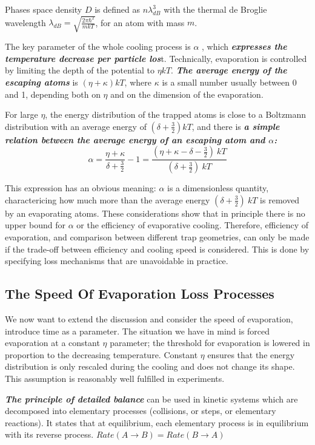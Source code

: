 \documentclass[12]{article}
\begin{document}
Phases space density $D$ is defined as $n\lambda^3_{dB}$ with the thermal de Broglie wavelength $\lambda_{dB} = \sqrt{\frac{2\pi \hbar^2}{mkT}}$, for an atom with mass $m$. 

The key parameter of the whole cooling process is $\alpha$ , which \textbf{\textit{expresses the temperature decrease per particle los}}t. Technically, evaporation is controlled by limiting the depth of the potential to $\eta kT$. \textbf{\textit{The average energy of the escaping atoms}} is $(\eta + \kappa)kT$, where $\kappa$ is a small number usually between 0 and 1, depending both on $\eta$ and on the dimension of the evaporation.  

For large $\eta$, the energy distribution of the trapped atoms is close to a Boltzmann distribution with an average energy of $(\delta+\frac{3}{2})kT$, and there is \textbf{\textit{a simple relation between the average energy of an escaping atom and $\alpha$:}} $$\alpha= \frac{\eta+\kappa}{\delta+\frac{3}{2}}-1 =\frac{(\eta+\kappa-\delta-\frac{3}{2})\ kT}{(\delta+\frac{3}{2})\ kT}$$

This expression has an obvious meaning: $\alpha$ is a dimensionless quantity, charactericing how much more than the average energy $(\delta+\frac{3}{2})\ kT$ is removed by an evaporating atoms. These considerations show that in principle there is no upper bound for $\alpha$ or the efficiency of evaporative cooling. Therefore, efficiency of evaporation, and comparison between different trap geometries, can only be made if the trade-off between efficiency and cooling speed is considered. This is done by specifying loss mechanisms that are unavoidable in practice.
\subsection{The Speed Of Evaporation Loss Processes}
We now want to extend the discussion and consider the speed of evaporation, introduce time as a parameter. The situation we have in mind is forced evaporation at a constant $\eta$ parameter; the threshold for evaporation is lowered in proportion to the decreasing temperature. Constant $\eta$ ensures that the energy distribution is only rescaled during the cooling and does not change its shape. This assumption is reasonably well fulfilled in experiments.

\textbf{\textit{The principle of detailed balance}} can be used in kinetic systems which are decomposed into elementary processes (collisions, or steps, or elementary reactions). It states that at equilibrium, each elementary process is in equilibrium with its reverse process. $Rate(A\rightarrow B)=Rate(B\rightarrow A)$
\end{document}

